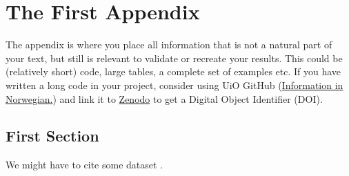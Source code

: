 \chapter{The First Appendix}
\label{sec:first-app}
\begin{refsection}
The appendix is where you place all information that is not a natural part of your text, but still is relevant to validate or recreate your results. This could be (relatively short) code, large tables, a complete set of examples etc. If you have written a long code in your project, consider using UiO GitHub (\hyperlink{https://www.uio.no/tjenester/it/maskin/filer/versjonskontroll/github.html}{Information in Norwegian.}) and link it to \hyperlink{https://zenodo.org/}{Zenodo} to get a Digital Object Identifier (DOI). 

\section{First Section}
We might have to cite some dataset \cite{data}.

\printbibliography[heading=subbibliography]
\end{refsection}